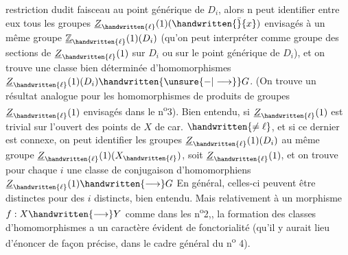 
restriction dudit faisceau au  point générique de $D_i$, alors n peut identifier entre eux tous les groupes $\underline{Z}_{\handwritten{\ell}}(1)(\handwritten{\bar}{x})$ envisagés à un même groupe $\underline{\mathbb{Z}}_{\handwritten{\ell}}(1)(D_i)$ (qu'on peut interpréter comme groupe des sections de $\underline{Z}_{\handwritten{\ell}}(1)$ sur $D_i$ ou sur le point générique de $D_i$), et on trouve une classe  bien déterminée d'homomorphismes $\underline{Z}_{\handwritten{\ell}}(1)(D_i)\handwritten{\unsure{\mathbin{-}|\longrightarrow}}G$. (On trouve un résultat analogue pour les homomorphismes de produits de groupes $\underline{Z}_{\handwritten{\ell}}(1)$ envisagés dans le n\textsuperscript{o}3). Bien entendu, si $\underline{Z}_{\handwritten{\ell}}(1)$ est trivial sur l'ouvert des points de $X$  de car. $\handwritten{\ne\ell}$, et si ce dernier est connexe, on peut identifier les groupes $\underline{Z}_{\handwritten{\ell}}(1)(D_i)$ au même groupe  $\underline{Z}_{\handwritten{\ell}}(1)(X_{\handwritten{\ell}})$,  soit $\underline{Z}_{\handwritten{\ell}}(1)$, et on trouve  pour chaque $i$ une classe de conjugaison d'homomorphiens $\underline{Z}_{\handwritten{\ell}}(1)\handwritten{\longrightarrow}G$ En général, celles-ci  peuvent être distinctes pour des $i$ distincts, bien entendu. Mais relativement à un morphisme $f:X\handwritten{\longrightarrow}Y$ comme dans les n\textsuperscript{o}2,, la formation des classes  d'homomorphismes a un caractère évident de fonctorialité (qu'il y aurait lieu d'énoncer de façon précise, dans le cadre général du n\textsuperscript{o} 4).


